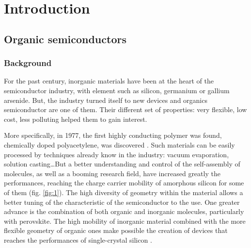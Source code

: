 
\chapter{Introduction}
\label{chap:intro}

\makeendnotes  %

\section{Organic semiconductors}

\subsection{Background}

For the past century, inorganic materials have been at the heart of the semiconductor industry, with element such as silicon, germanium or gallium arsenide. But, the industry turned itself to new devices and organics semiconductor are one of them. Their different set of properties: very flexible, low cost, less polluting helped them to gain interest.

More specifically, in 1977, the first highly conducting polymer was found, chemically doped polyacetylene, was discovered \cite{polyacetylene}. Such materials can be easily processed by techniques already know in the industry: vacuum evaporation, solution casting\dots But a better understanding and control of the self-assembly of molecules, as well as a booming research field, have increased greatly the performances, reaching the charge carrier mobility of amorphous silicon for some of them (fig. \ref{fig:1}). The high diversity of geometry within the material allows a better tuning of the characteristic of the semiconductor to the use. One greater advance is the combination of both organic and inorganic molecules, particularly with perovskite. The high mobility of inorganic material combined with the more flexible geometry of organic ones make possible the creation of devices that reaches the performances of single-crystal silicon \cite{IBM,perovskite}.

